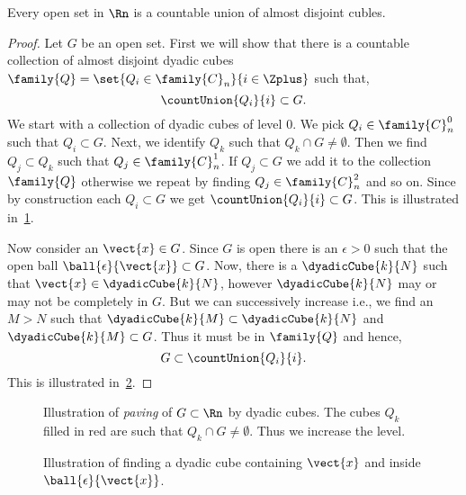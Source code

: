 \begin{Proposition}\label{prop:count_col_cubes}
    Every open set in $\Rn$ is a countable union of almost disjoint cubles.
\end{Proposition}
\begin{proof}
    Let $G$ be an open set. First we will show that there is a countable collection of almost
    disjoint dyadic cubes $\family{Q}=\set{Q_i \in \family{C}_n}{i\in\Zplus}$ such that,
    \[\countUnion{Q_i}{i} \subset G. \]
    We start with a collection of dyadic cubes of level $0$. We pick $Q_i \in
    \family{C}_n^0$ such that $Q_i \subset G$. Next, we identify $Q_k$ such that $Q_k \cap G \neq
    \emptyset$. Then we find $Q_j \subset Q_k$ such that $Q_j \in \family{C}^1_{n}$. If $Q_j \subset G$
    we add it to the collection $\family{Q}$ otherwise we repeat by finding $Q_j \in
    \family{C}^2_{n}$ and so on. Since by construction each $Q_i
    \subset G$ we get $\countUnion{Q_i}{i} \subset G$. This is illustrated
    in~\ref{fig:tikz:countable_closed_cubes}.

    Now consider an $\vect{x} \in G$. Since $G$ is open there is an $\epsilon > 0$ such that the
    open ball $\ball{\epsilon}{\vect{x}} \subset G$. Now, there is a $\dyadicCube{k}{N}$ 
    such that $\vect{x} \in \dyadicCube{k}{N}$, 
    however $\dyadicCube{k}{N}$ may or may not be completely in $G$. 
    But we can successively increase i.e., we find an $M > N$ such that $\dyadicCube{k}{M} \subset
    \dyadicCube{k}{N}$ and $\dyadicCube{k}{M} \subset G$. Thus it must be in $\family{Q}$ and hence,
    \[G \subset \countUnion{Q_i}{i}. \] 
    This is illustrated in~\ref{fig:tikz:countable_closed_cubes2}.
\end{proof}
\begin{figure}
    
    \caption{Illustration of \emph{paving} of $G\subset \Rn$ by dyadic cubes. The cubes $Q_k$ 
	filled in red are such that $Q_k \cap G \neq \emptyset$. Thus we increase the level.
	}\label{fig:tikz:countable_closed_cubes}
\end{figure}
\begin{figure}
    
    \caption{Illustration of finding a dyadic cube containing $\vect{x}$ and inside
	$\ball{\epsilon}{\vect{x}}$.}\label{fig:tikz:countable_closed_cubes2}
\end{figure}


